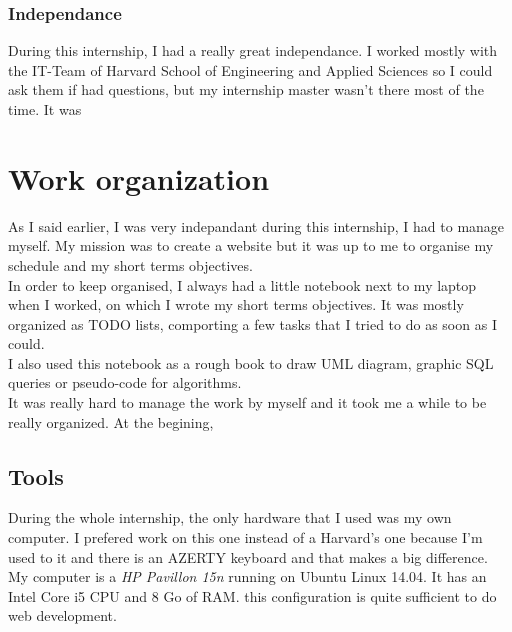 \documentclass[10pt,a4paper]{article}
\newcommand{\hseas}{Harvard School of Engineering and Applied Sciences}
\begin{document}
\subsubsection*{Independance}
During this internship, I had a really great independance. I worked mostly with the IT-Team of \hseas{} so I could ask them if had questions, but my internship master wasn't there most of the time. It was


\section{Work organization}
As I said earlier, I was very indepandant during this internship, I had to manage myself. My mission was to create a website but it was up to me to organise my schedule and my short terms objectives.\\
In order to keep organised, I always had a little notebook next to my laptop when I worked, on which I wrote my short terms objectives. It was mostly organized as TODO lists, comporting a few tasks that I tried to do as soon as I could.\\
I also used this notebook as a rough book to draw UML diagram, graphic SQL queries or pseudo-code for algorithms.\\

It was really hard to manage the work by myself and it took me a while to be really organized. At the begining, %

\subsection{Tools}

During the whole internship, the only hardware that I used was my own computer. I prefered work on this one instead of a Harvard's one because I'm used to it and there is an AZERTY keyboard and that makes a big difference.\\
My computer is a \textit{HP Pavillon 15n} running on Ubuntu Linux 14.04. It has an Intel Core i5 CPU and 8 Go of RAM\@. this configuration is quite sufficient to do web development.\\
\end{document}
